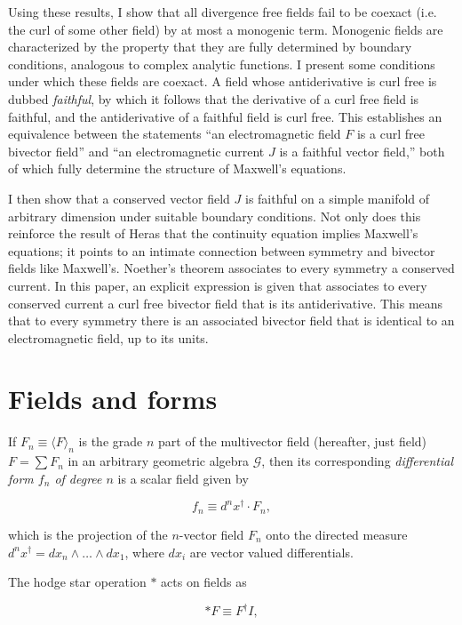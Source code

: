 \documentclass{article}
\begin{document}
Using these results, I show that all divergence free fields fail to be coexact (i.e. the curl of some other field) by at most a monogenic term. Monogenic fields are characterized by the property that they are fully determined by boundary conditions, analogous to complex analytic functions. I present some conditions under which these fields are coexact. A field whose antiderivative is curl free is dubbed \emph{faithful}, by which it follows that the derivative of a curl free field is faithful, and the antiderivative of a faithful field is curl free. This establishes an equivalence between the statements ``an electromagnetic field $F$ is a curl free bivector field'' and ``an electromagnetic current $J$ is a faithful vector field,'' both of which fully determine the structure of Maxwell's equations. 

I then show that a conserved vector field $J$ is faithful on a simple manifold of arbitrary dimension under suitable boundary conditions. Not only does this reinforce the result of Heras that the continuity equation implies Maxwell's equations; it points to an intimate connection between symmetry and bivector fields like Maxwell's. Noether's theorem associates to every symmetry a conserved current. In this paper, an explicit expression is given that associates to every conserved current a curl free bivector field that is its antiderivative. This means that to every symmetry there is an associated bivector field that is identical to an electromagnetic field, up to its units.

\section{Fields and forms} If $F_n \equiv \langle F \rangle_n$ is the grade $n$ part of the multivector field (hereafter, just field) $F = \sum F_n$ in an arbitrary geometric algebra $\mathcal{G}$, then its corresponding \emph{differential form $f_n$ of degree $n$} is a scalar field given by \cite{cagc}

\begin{equation}
  f_n \equiv d^nx^\dagger \cdot F_n,\label{eq:form}
\end{equation}

which is the projection of the $n$-vector field $F_n$ onto the directed measure $d^nx^\dagger = dx_n \wedge \dots \wedge dx_1$, where $dx_i$ are vector valued differentials. 

The hodge star operation $*$ acts on fields as

\begin{equation}
  *F \equiv F^\dagger I,\label{eq:hodge}
\end{equation}
\end{document}
